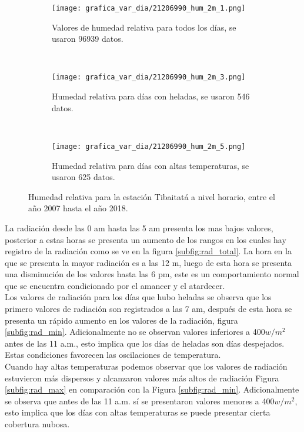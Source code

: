 \begin{figure}[H]
    \centering
    \begin{subfigure}[b]{0.45\textwidth}
       \caption{Valores de humedad relativa para todos los días, se usaron 96939 datos.}
	\texttt{[image: grafica\_var\_dia/21206990\_hum\_2m\_1.png]}
     \label{subfig:hum_total}
	\end{subfigure}
	~
    \begin{subfigure}[b]{0.45\textwidth}
       \caption{Humedad relativa para días con heladas, se usaron 546 datos.}
	\texttt{[image: grafica\_var\_dia/21206990\_hum\_2m\_3.png]}
     \label{subfig:hum_min}
	\end{subfigure}
		~
    \begin{subfigure}[b]{0.45\textwidth}
       \caption{Humedad relativa para días con altas temperaturas, se usaron 625 datos.}
	\texttt{[image: grafica\_var\_dia/21206990\_hum\_2m\_5.png]}
     \label{subfig:hum_max}
	\end{subfigure}
	
    \caption{Humedad relativa para la estación Tibaitatá a nivel horario, entre el año 2007 hasta el año 2018.}
    \label{fig:hr_tibaitata}
\end{figure}


La radiación desde las 0 am hasta las 5 am presenta los mas bajos valores, posterior a estas horas se presenta un aumento de los rangos en los cuales hay registro de la radiación como se ve en la figura \ref{subfig:rad_total}. La hora en la que se presenta la mayor radiación es a las 12 m, luego de esta hora se presenta una disminución de los valores hasta las 6 pm, este es un comportamiento normal que se encuentra condicionado por el amancer y el atardecer.\\

Los valores de radiación para los días que hubo heladas se observa que los primero valores de radiación son registrados a las 7 am, después de esta hora se presenta un rápido aumento en los valores de la radiación, figura \ref{subfig:rad_min}. Adicionalmente no se observan valores inferiores a 400$w/m^2$ antes de las 11 a.m., esto implica que los días de heladas son días despejados. Estas condiciones favorecen las oscilaciones de temperatura.\\

Cuando hay altas temperaturas podemos observar que los valores de radiación estuvieron más dispersos y alcanzaron valores más altos de radiación Figura \ref{subfig:rad_max} en comparación con la Figura \ref{subfig:rad_min}. Adicionalmente se observa que antes de las 11 a.m. sí se presentaron valores menores a 400$w/m^2$, esto implica que los días con altas temperaturas se puede presentar cierta cobertura nubosa.\\

